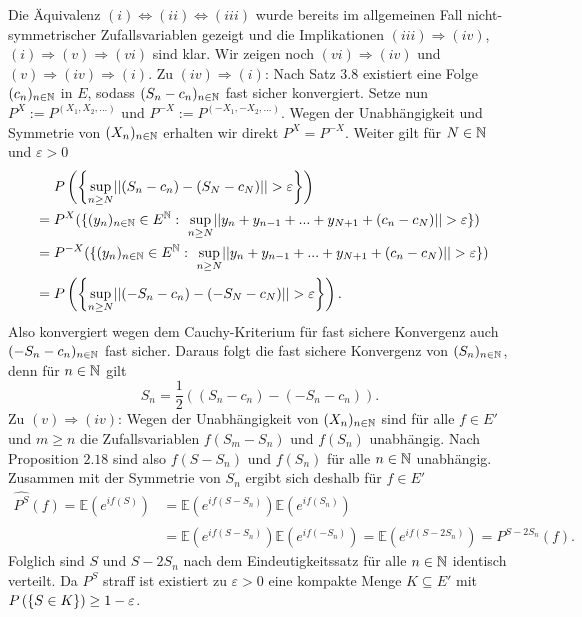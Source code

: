 \begin{proof*}
    Die Äquivalenz $(i) \iff (ii) \iff (iii)$ wurde bereits im allgemeinen Fall nicht-symmetrischer Zufallsvariablen gezeigt und die Implikationen $(iii) \Rightarrow (iv)$, $(i) \Rightarrow (v) \Rightarrow (vi)$ sind klar. 
    Wir zeigen noch $(vi) \Rightarrow (iv)$ und $(v) \Rightarrow (iv) \Rightarrow (i)$. 
    \newline
    Zu $(iv) \Rightarrow (i)$:
    Nach Satz $3.8$ existiert eine Folge $(c_n)_{n \in \mathbb{N}}$ in $E$, sodass $(S_n - c_n)_{n \in \mathbb{N}}$ fast sicher konvergiert. Setze nun $P^X := P^{(X_1,X_2,...)}$ und $P^{-X} :=P^{(-X_1,-X_2,...)}$. 
    Wegen der Unabhängigkeit und Symmetrie von $(X_n)_{n \in \mathbb{N}}$ erhalten wir direkt $P^X = P^{-X}$. Weiter gilt für $N \in \mathbb{N}$ und $\varepsilon >0$
    \begin{align*}
        &\quad \ P\left(\left\{ \sup_{n \geq N}\lvert\lvert (S_n - c_n) - (S_N- c_N) \rvert\rvert > \varepsilon \right\}\right) \\\
                &= P^X(\{(y_n)_{n \in \mathbb{N}}\in E^{\mathbb{N}}: \  \sup_{n \geq N}\lvert\lvert y_n + y_{n-1} + ... + y_{N+1} + (c_n - c_N) \rvert\rvert > \varepsilon \}) \\\
                &= P^{-X}(\{(y_n)_{n \in \mathbb{N}}\in E^{\mathbb{N}}: \ \sup_{n \geq N}\lvert\lvert y_n + y_{n-1} + ... + y_{N+1} + (c_n - c_N) \rvert\rvert > \varepsilon \}) \\\
                &= P\left(\left\{ \sup_{n \geq N}\lvert\lvert (-S_n - c_n) - (-S_N - c_N) \rvert\rvert > \varepsilon \right\}\right).
    \end{align*}
    Also konvergiert wegen dem Cauchy-Kriterium für fast sichere Konvergenz auch $(-S_n - c_n)_{n \in \mathbb{N}}$ fast sicher. Daraus folgt die fast sichere Konvergenz von $(S_n)_{n \in \mathbb{N}}$, denn für $n \in \mathbb{N}$ gilt
    $$
       S_n =  \frac{1}{2}((S_n - c_n) - (-S_n -c_n)). 
    $$
    Zu $(v) \Rightarrow (iv)$: Wegen der Unabhängigkeit von $(X_n)_{n \in \mathbb{N}}$ sind für alle $f \in E'$ und $m \geq n$ die Zufallsvariablen $f(S_m - S_n)$ und $f(S_n)$ unabhängig. 
    Nach Proposition $2.18$ sind also $f(S-S_n)$ und $f(S_n)$ für alle $n \in \mathbb{N}$ unabhängig. Zusammen mit der Symmetrie von $S_n$ ergibt sich deshalb für $f \in E'$
    \begin{align*}
        \widehat{P^S}(f) = \mathbb{E}(e^{if(S)}) &= \mathbb{E}(e^{if(S-S_n)})\mathbb{E}(e^{if(S_n)})  \\\
                                        &= \mathbb{E}(e^{if(S-S_n)})\mathbb{E}(e^{if(-S_n)}) = \mathbb{E}(e^{if(S-2S_n)}) = \widehat{P^{S-2S_n}}(f).
    \end{align*}
    Folglich sind $S$ und $S - 2S_n$ nach dem Eindeutigkeitssatz für alle $n \in \mathbb{N}$  identisch verteilt. Da $P^S$ straff ist existiert zu $\varepsilon >0$ eine kompakte Menge $K \subseteq E'$ mit $P\left(\left\{ S \in K \right\}\right) \geq 1 - \varepsilon$. 

\end{proof*}
